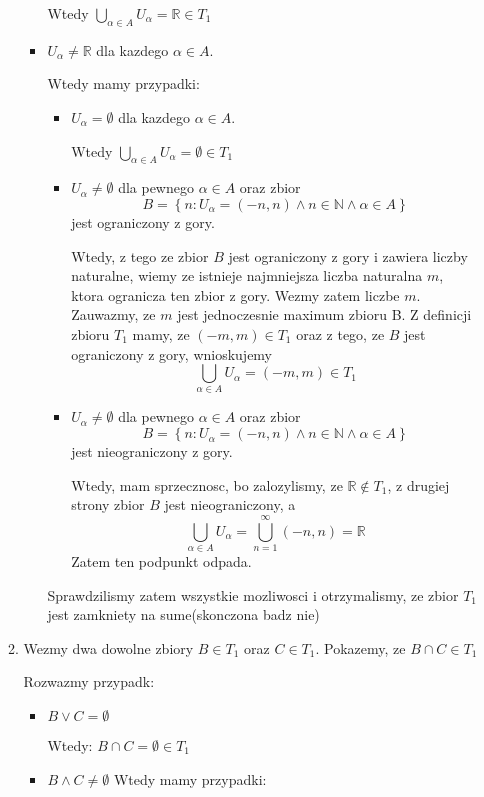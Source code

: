\documentclass{article}
\begin{document}
\begin{enumerate}
\begin{enumerate}[label=(\alph*')]
\begin{itemize}
Wtedy $ \bigcup\limits_{\alpha \in A} U_{\alpha} = \mathbb{R} \in T_{1}$
\item $U_{\alpha} \neq \mathbb{R}$ dla kazdego $\alpha \in A$.

Wtedy mamy przypadki:

\begin{itemize}
    \item $U_{\alpha} = \emptyset$ dla kazdego $\alpha \in A$. 

Wtedy $\bigcup\limits_{\alpha \in A} U_{\alpha} = \emptyset \in T_{1}$  
    \item $U_{\alpha} \neq \emptyset$ dla pewnego $\alpha \in A$ oraz zbior $$B = \left\{n: U_{\alpha} = (-n, n)  \land n \in \mathbb{N} \land \alpha \in A\right\}$$ jest ograniczony z gory.

Wtedy, z tego ze zbior $B$ jest ograniczony z gory i zawiera liczby naturalne, wiemy ze istnieje najmniejsza liczba naturalna $m$, ktora ogranicza ten zbior z gory. Wezmy zatem liczbe $m$. Zauwazmy, ze $m$ jest jednoczesnie maximum zbioru B. Z definicji zbioru $T_{1}$ mamy, ze $(-m, m) \in T_{1}$ oraz z tego, ze $B$ jest ograniczony z gory, wnioskujemy $$\bigcup\limits_{\alpha \in A} U_{\alpha} = (-m,m) \in T_{1}$$

    \item $U_{\alpha} \neq \emptyset$ dla pewnego $\alpha \in A$ oraz zbior $$B = \left\{n: U_{\alpha} = (-n, n) \land n \in \mathbb{N} \land \alpha \in A\right\}$$ jest nieograniczony z gory.

Wtedy, mam sprzecznosc, bo zalozylismy, ze $\mathbb{R} \notin T_{1}$, z drugiej strony zbior $B$ jest nieograniczony, a $$\bigcup\limits_{\alpha \in A}U_{\alpha} = \bigcup\limits_{n=1}^{\infty}(-n, n) = \mathbb{R}$$ 
Zatem ten podpunkt odpada.

\end{itemize}

Sprawdzilismy zatem wszystkie mozliwosci i otrzymalismy, ze zbior $T_{1}$ jest zamkniety na sume(skonczona badz nie)

\end{itemize}
\item Wezmy dwa dowolne zbiory $B \in T_{1}$ oraz $C \in T_{1}$. Pokazemy, ze $B \cap C \in T_{1}$

Rozwazmy przypadk:
\begin{itemize}
    
\item $B \lor C = \emptyset$

Wtedy: $B \cap C = \emptyset \in T_{1}$
\item $B \land C \neq \emptyset$ Wtedy mamy przypadki:


\end{itemize}
\end{enumerate}
\end{enumerate}
\end{document}
